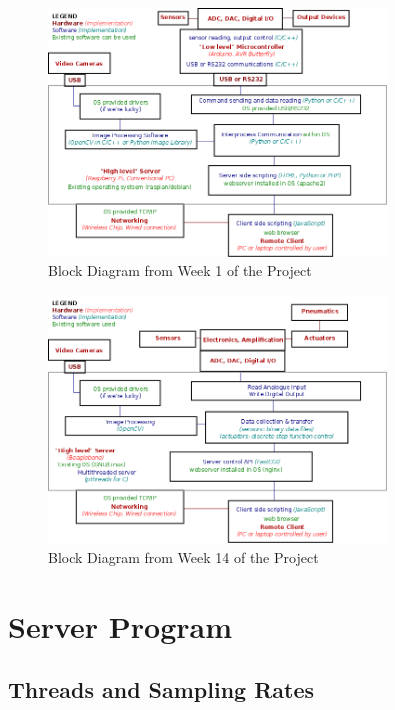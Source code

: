 \begin{figure}[H]
	\centering
	\includegraphics[width=0.8\textwidth]{figures/block_diagram1.png}
	\caption{Block Diagram from Week 1 of the Project}
	\label{block_diagram1.png}
\end{figure}


\begin{figure}[H]
	\centering
	\includegraphics[width=0.8\textwidth]{figures/block_diagram_final.png}
	\caption{Block Diagram from Week 14 of the Project}
	\label{block_diagram_final.png}
\end{figure}

\section{Server Program}\label{Server Program}

\subsection{Threads and Sampling Rates}

